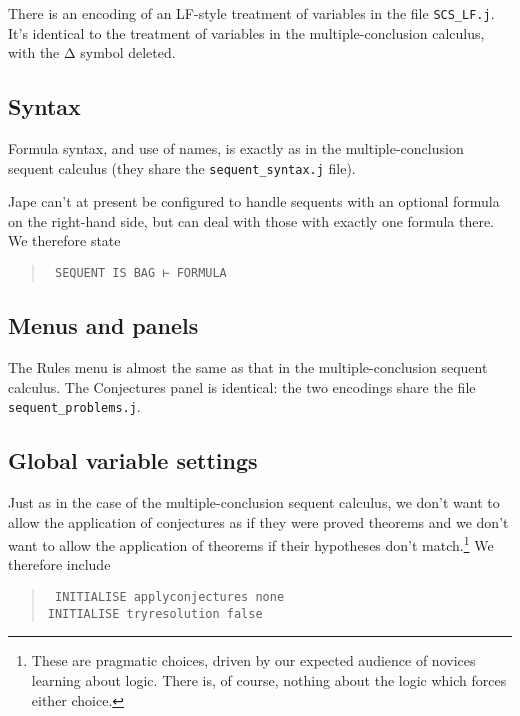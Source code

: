 There is an encoding of an LF-style treatment of variables in the file \texttt{SCS\_LF.j}. It's identical to the treatment of variables in the multiple-conclusion calculus, with the Δ symbol deleted.

\subsection{Syntax}

Formula syntax, and use of names, is exactly as in the multiple-conclusion sequent calculus (they share the \texttt{sequent\_syntax.j} file).

Jape can't at present be configured to handle sequents with an optional formula on the right-hand side, but can deal with those with exactly one formula there. We therefore state
\begin{quote}\tt\small
SEQUENT IS BAG ⊢ FORMULA
\end{quote}

\subsection{Menus and panels}

The Rules menu is almost the same as that in the multiple-conclusion sequent calculus. The Conjectures panel is identical: the two encodings share the file \texttt{sequent\_problems.j}.

\subsection{Global variable settings}

Just as in the case of the multiple-conclusion sequent calculus, we don't want to allow the application of conjectures as if they were proved theorems and we don't want to allow the application of theorems if their hypotheses don't match.\footnote{These are pragmatic choices, driven by our expected audience of novices learning about logic. There is, of course, nothing about the logic which forces either choice.} We therefore include
\begin{quote}\tt\small
INITIALISE applyconjectures none\\
INITIALISE tryresolution false
\end{quote}

